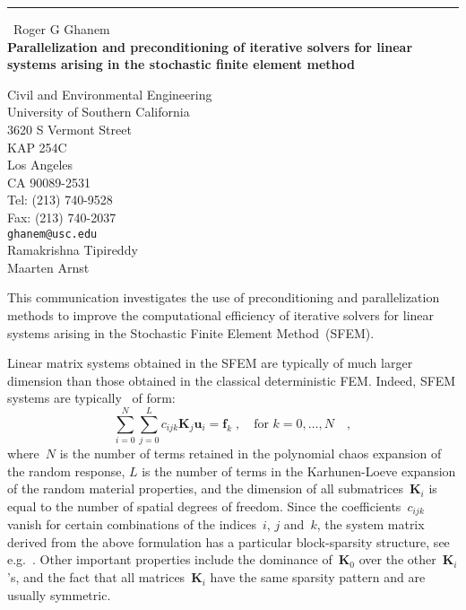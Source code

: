 \documentclass{report}
\begin{document}
\begin{center}
\rule{6in}{1pt} \
{\large Roger G Ghanem \\
{\bf Parallelization and preconditioning of iterative solvers for linear systems arising in the stochastic finite element method}}

Civil and Environmental Engineering \\ University of Southern California \\ 3620 S Vermont Street \\ KAP 254C \\ Los Angeles \\ CA 90089-2531 \\ Tel: (213) 740-9528 \\ Fax: (213) 740-2037
\\
{\tt ghanem@usc.edu}\\
Ramakrishna Tipireddy\\
Maarten Arnst\end{center}

This communication investigates the use of preconditioning and
parallelization methods to improve the computational efficiency of
iterative solvers for linear systems arising in the Stochastic Finite
Element Method~(SFEM).

Linear matrix systems obtained in the SFEM are typically of much larger
dimension than those obtained in the classical deterministic FEM. Indeed,
SFEM systems are typically~\cite{ghanem1991} of form:
\begin{equation}
\sum_{i=0}^{N}\sum_{j=0}^{L}c_{ijk}\boldsymbol{K}_{j}\boldsymbol{u}_{i}=\boldsymbol{f}_{k}\;,\quad\text{for~$k
= 0,\ldots,N$}\quad,\label{eq:sfemsystem}
\end{equation}
where~$N$ is the number of terms retained in the polynomial chaos
expansion of the random response, $L$ is the number of terms in the
Karhunen-Loeve expansion of the random material properties, and the
dimension of all submatrices~$\boldsymbol{K}_{i}$ is equal to the number
of spatial degrees of freedom. Since the coefficients~$c_{ijk}$ vanish
for certain combinations of the indices~$i$, $j$ and~$k$, the system
matrix derived from the above formulation has a particular block-sparsity
structure, see e.g.~\cite{pellisetti2000}. Other important properties
include the dominance of~$\boldsymbol{K}_0$ over the
other~$\boldsymbol{K}_i$'s, and the fact that all
matrices~$\boldsymbol{K}_i$ have the same sparsity pattern and are
usually symmetric.
\end{document}
